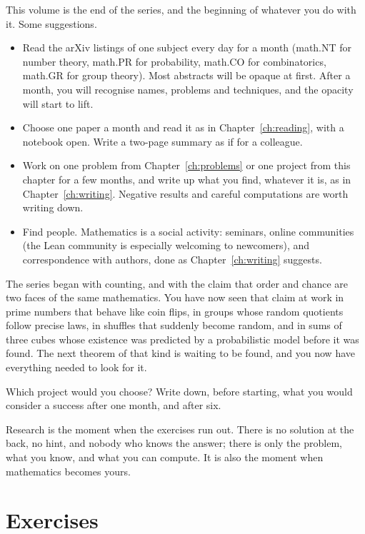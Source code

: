 This volume is the end of the series, and the beginning of whatever you do with it. Some suggestions.
\begin{itemize}
\item Read the arXiv listings of one subject every day for a month (math.NT for number theory, math.PR for probability, math.CO for combinatorics, math.GR for group theory). Most abstracts will be opaque at first. After a month, you will recognise names, problems and techniques, and the opacity will start to lift.
\item Choose one paper a month and read it as in Chapter~\ref{ch:reading}, with a notebook open. Write a two-page summary as if for a colleague.
\item Work on one problem from Chapter~\ref{ch:problems} or one project from this chapter for a few months, and write up what you find, whatever it is, as in Chapter~\ref{ch:writing}. Negative results and careful computations are worth writing down.
\item Find people. Mathematics is a social activity: seminars, online communities (the Lean community is especially welcoming to newcomers), and correspondence with authors, done as Chapter~\ref{ch:writing} suggests.
\end{itemize}

The series began with counting, and with the claim that order and chance are two faces of the same mathematics. You have now seen that claim at work in prime numbers that behave like coin flips, in groups whose random quotients follow precise laws, in shuffles that suddenly become random, and in sums of three cubes whose existence was predicted by a probabilistic model before it was found. The next theorem of that kind is waiting to be found, and you now have everything needed to look for it.

\begin{think}
Which project would you choose? Write down, before starting, what you would consider a success after one month, and after six.
\end{think}

\begin{beauty}
Research is the moment when the exercises run out. There is no solution at the back, no hint, and nobody who knows the answer; there is only the problem, what you know, and what you can compute. It is also the moment when mathematics becomes yours.
\end{beauty}

\section{Exercises}

